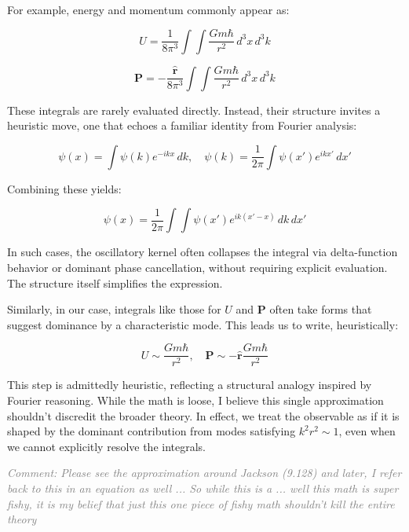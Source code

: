 \documentclass {article}
\renewcommand\vec{\mathbf}
\let\OldHat\hat
\renewcommand{\hat}[1]{\OldHat{\mathbf{#1}}}
\newcommand{\comment}[1]{\textcolor{gray}{\small\textit{Comment: #1}}}
\begin{document}
For example, energy and momentum commonly appear as:

\begin{equation}
U = \frac{1}{8\pi^3} \int \int \frac{Gm\hbar}{r^2} \, d^3x \, d^3k
\end{equation}

\begin{equation}
\vec{P}  = - \frac{\hat{r}}{8\pi^3} \int \int \frac{Gm\hbar}{r^2} \, d^3x \, d^3k
\end{equation}

These integrals are rarely evaluated directly. Instead, their structure invites a heuristic move, one that echoes a familiar identity from Fourier analysis:

\begin{equation}
\psi(x) = \int \psi(k) e^{-ikx} \, dk, \quad
\psi(k) = \frac{1}{2\pi} \int \psi(x') e^{ikx'} \, dx'
\end{equation}

Combining these yields:

\begin{equation}
\psi(x) = \frac{1}{2\pi} \int \int \psi(x') e^{ik(x' - x)} \, dk \, dx'
\end{equation}

In such cases, the oscillatory kernel often collapses the integral via delta-function behavior or dominant phase cancellation, without requiring explicit evaluation. The structure itself simplifies the expression.


Similarly, in our case, integrals like those for \(U\) and \(\vec{P}\) often take forms that suggest dominance by a characteristic mode. This leads us to write, heuristically:


\begin{equation}
U \sim \frac{Gm\hbar}{r^2}, \quad
\vec{P}  \sim -\hat{r} \frac{Gm\hbar}{r^2}
\end{equation}

This step is admittedly heuristic, reflecting a structural analogy inspired by Fourier reasoning. While the math is loose, I believe this single approximation shouldn’t discredit the broader theory. In effect, we treat the observable as if it is shaped by the dominant contribution from modes satisfying \(k^2 r^2 \sim 1\), even when we cannot explicitly resolve the integrals.

\comment{Please see the approximation around Jackson (9.128) and later, I refer back to this in an equation as well ... So while this is a ... well this math is super fishy, it is my belief that just this one piece of fishy math shouldn't kill the entire theory}
\end{document}
